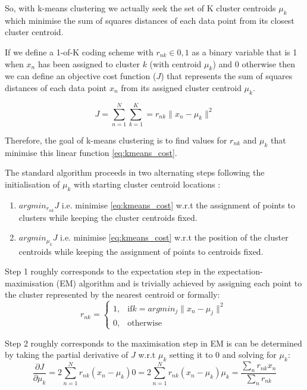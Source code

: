 So, with k-means clustering we actually seek the set of K cluster centroids \({\mu_{k}}\) 
which minimise the sum of squares distances of each data point from its closest cluster centroid.
\citep{Bishop2006}

If we define a 1-of-K coding scheme with \(r_{nk} \in {0,1}\) as a binary variable that is 1 when \(x_{n}\) has been
assigned to cluster \(k\) (with centroid \(\mu_{k}\)) and 0 otherwise then we can define an objective cost function (\(J\)) 
that represents the sum of squares distances of each data point \(x_{n}\) from its assigned cluster centroid \(\mu_{k}\).

\[ 
    J = \sum_{n=1}^{N}\sum_{k=1}^{K} = r_{nk} \|x_{n} - \mu_{k}\|^{2} %
    \label{eq:kmeans_cost}
\]

Therefore, the goal of k-means clustering is to find values for \({r_{nk}}\) and \({\mu_{k}}\) that minimise this linear 
function \ref{eq:kmeans_cost}.
\citep{Bishop2006}


The standard algorithm proceeds in two alternating steps following the initialisation of \(\mu_{k}\) with starting
cluster centroid locations \citep{Forgy1965,Lloyd1982}:
\begin{enumerate}
    \item \(argmin_{r_{nk}} J\) i.e. minimise \ref{eq:kmeans_cost} w.r.t the assignment of points to clusters while keeping
        the cluster centroids fixed.
    \item \(argmin_{\mu_{k}} J\) i.e. minimise \ref{eq:kmeans_cost} w.r.t the position of the cluster centroids while keeping
        the assignment of points to centroids fixed.
\end{enumerate}

Step 1 roughly corresponds to the expectation step in the expectation-maximisation (EM) algorithm and is trivially achieved by 
assigning each point to the cluster represented by the nearest centroid or formally:
\[
    r_{nk} = 
    \begin{cases}
        1,& \text{if} k=argmin_{j} \|x_{n} - \mu_{j}\|^{2}\\
        0,& \text{otherwise}
    \end{cases}
\]

Step 2 roughly corresponds to the maximisation step in EM is can be determined by taking the partial derivative of \(J\) w.r.t 
\(\mu_{k}\) setting it to 0 and solving for \(\mu_{k}\):
\[
    \frac{\partial J}{\partial \mu_{k}} = 2 \sum_{n=1}^{N} r_{nk} (x_{n} - \mu_{k}) %
    0 = 2 \sum_{n=1}^{N} r_{nk} (x_{n} - \mu_{k})
    \mu_{k} = \frac{\sum_{n} r_{nk}x_{n}}{\sum_{n} r_{nk}}
\]

